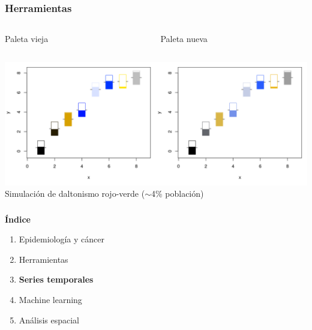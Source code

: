 \documentclass{beamer}
\begin{document}

\begin{frame}\frametitle{Herramientas}
	
	\begin{columns}
		\begin{column}{0.5\textwidth}
			\centering \hspace{15pt} Paleta vieja
		\end{column}
		\begin{column}{0.5\textwidth}
			\centering \hspace{15pt} Paleta nueva
		\end{column}
	\end{columns}
	
	\centering
	\includegraphics[width=1\textwidth]{images/palette3}\\
	\large 
	Simulación de daltonismo rojo-verde ($\sim$4\% población)
\end{frame}


\begin{frame}\frametitle{}
	\Large{\textbf{Índice}}\\[2ex]
	\normalsize
	\begin{enumerate}
		\item Epidemiología y cáncer\\[2ex]
		\item Herramientas\\[2ex]
		\item \textbf{Series temporales} \\[2ex]
		\item Machine learning  \\[2ex]
		\item Análisis espacial \\[2ex]
	\end{enumerate}
\end{frame}
\end{document}

